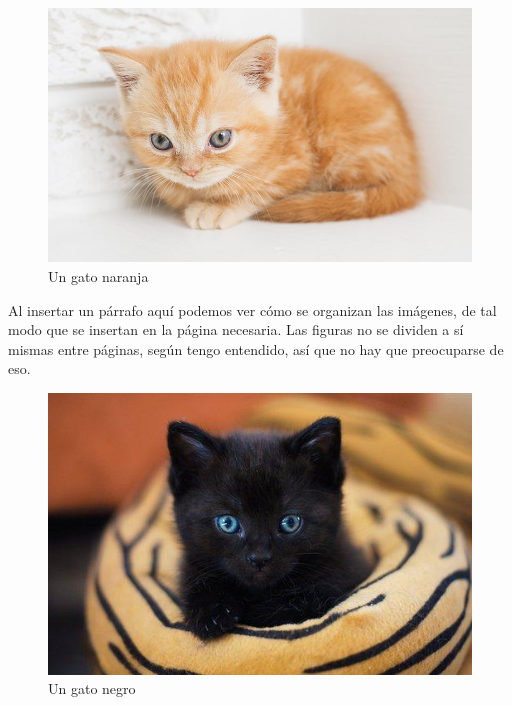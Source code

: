 \documentclass{article}
\begin{document}

\begin{figure}[H]
    \centering 
    \includegraphics[width=1.0\hsize]{gatito}
    \caption{Un gato naranja}
    \label{fig:gatitoNaranja} 
\end{figure}

Al insertar un párrafo aquí podemos ver cómo se organizan las imágenes, de tal
modo que se insertan en la página necesaria. Las figuras no se dividen a sí
mismas entre páginas, según tengo entendido, así que no hay que preocuparse
de eso.

\begin{figure}[H]
    \centering
    \includegraphics[width=0.3333\hsize]{./img/gatitoNegro}
    \caption{Un gato negro} %
    \label{fig:gatitoNegro} %
\end{figure}
\end{document}
